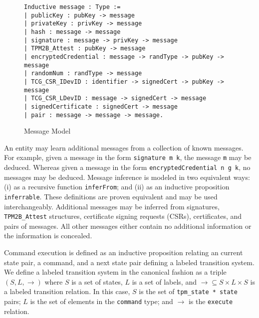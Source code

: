 \documentclass[runningheads]{llncs}
\begin{document}
\begin{figure}[hbtp]
\begin{lstlisting}[language=Coq]
Inductive message : Type :=
| publicKey : pubKey -> message
| privateKey : privKey -> message
| hash : message -> message
| signature : message -> privKey -> message
| TPM2B_Attest : pubKey -> message
| encryptedCredential : message -> randType -> pubKey -> message
| randomNum : randType -> message
| TCG_CSR_IDevID : identifier -> signedCert -> pubKey -> message
| TCG_CSR_LDevID : message -> signedCert -> message
| signedCertificate : signedCert -> message
| pair : message -> message -> message.
\end{lstlisting}
\caption{Message Model}
\label{fig:message-model}
\end{figure}

An entity may learn additional messages from a collection of known
messages. For example, given a message in the form
\verb|signature m k|, the message \verb|m| may be deduced. Whereas
given a message in the form \verb|encryptedCredential n g k|, no
messages may be deduced. Message inference is modeled in two
equivalent ways: (i) as a recursive function \verb|inferFrom|; and
(ii) as an inductive proposition \verb|inferrable|. These definitions
are proven equivalent and may be used interchangeably.  Additional
messages may be inferred from signatures, \verb|TPM2B_Attest|
structures, certificate signing requests (CSRs), certificates, and
pairs of messages. All other messages either contain no additional
information or the information is concealed.

Command execution is defined as an inductive proposition relating an
current state pair, a command, and a next state pair defining a
labeled transition system. We define a labeled transition system in
the canonical fashion as a triple $(S,L,\rightarrow)$ where $S$ is a
set of states, $L$ is a set of labels, and
$\rightarrow \subseteq S \times L \times S$ is a labeled transition
relation. In this case, $S$ is the set of \verb|tpm_state * state|
pairs; $L$ is the set of elements in the \verb|command| type; and
$\rightarrow$ is the \verb|execute| relation.

\end{document}

